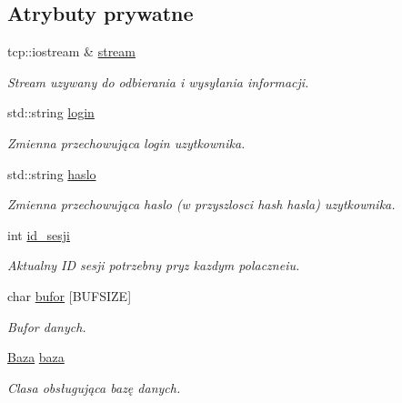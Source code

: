 \subsection*{Atrybuty prywatne}
\begin{CompactItemize}
\item 
tcp::iostream \& \hyperlink{a00005_f95fb0cac229181329fa61f7bc72c65b}{stream}
\begin{CompactList}\small\item\em Stream uzywany do odbierania i wysyłania informacji. \item\end{CompactList}\item 
std::string \hyperlink{a00005_8bb124a2f285074773d1b0ee62cf0cc0}{login}
\begin{CompactList}\small\item\em Zmienna przechowująca login uzytkownika. \item\end{CompactList}\item 
std::string \hyperlink{a00005_2fc04d16e2ba688c5b306a2ad6770039}{haslo}
\begin{CompactList}\small\item\em Zmienna przechowująca haslo (w przyszlosci hash hasla) uzytkownika. \item\end{CompactList}\item 
int \hyperlink{a00005_aa8407d10d299b524fa2f74532e537ac}{id\_\-sesji}
\begin{CompactList}\small\item\em Aktualny ID sesji potrzebny pryz kazdym polaczneiu. \item\end{CompactList}\item 
char \hyperlink{a00005_2e7575bebca6d0fd9f5a8bfe6fc652d0}{bufor} \mbox{[}BUFSIZE\mbox{]}
\begin{CompactList}\small\item\em Bufor danych. \item\end{CompactList}\item 
\hyperlink{a00001}{Baza} \hyperlink{a00005_21b4b313249353e48f7ea67f534ee519}{baza}
\begin{CompactList}\small\item\em Clasa obsługująca bazę danych. \item\end{CompactList}\end{CompactItemize}


